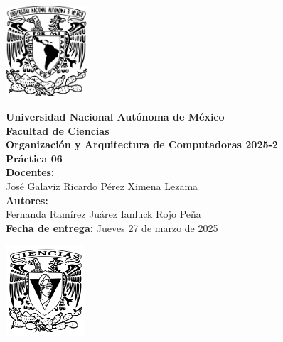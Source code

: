 \documentclass[12pt,letterpaper]{article}
\begin{document}
\begin{center}
  \begin{minipage}{3cm}
    \begin{center}
      \includegraphics[height=3.4cm]{../unam_logo.png}
    \end{center}
  \end{minipage}\hfill
  \begin{minipage}{10cm}
    \begin{center}
      \textbf{\Large Universidad Nacional Autónoma de México}\\[0.2cm]
      \textbf{\large Facultad de Ciencias}\\[0.2cm]
      \textbf{Organización y Arquitectura de Computadoras 2025-2}\\[0.4cm]
      \textbf{\Large Práctica 06}\\[0.1cm]
      \textbf{Docentes:}\\
      José Galaviz \hspace{1em} Ricardo Pérez \hspace{1em} Ximena Lezama\\[0.3cm]
      \textbf{Autores:}\\
      Fernanda Ramírez Juárez \quad Ianluck Rojo Peña\\[0.3cm]
      \textbf{Fecha de entrega:} Jueves 27 de marzo de 2025
    \end{center}
  \end{minipage}\hfill
  \begin{minipage}{3cm}
    \begin{center}
      \includegraphics[height=3.4cm]{../fc_logo.png}
    \end{center}
  \end{minipage}
\end{center}
\end{document}
